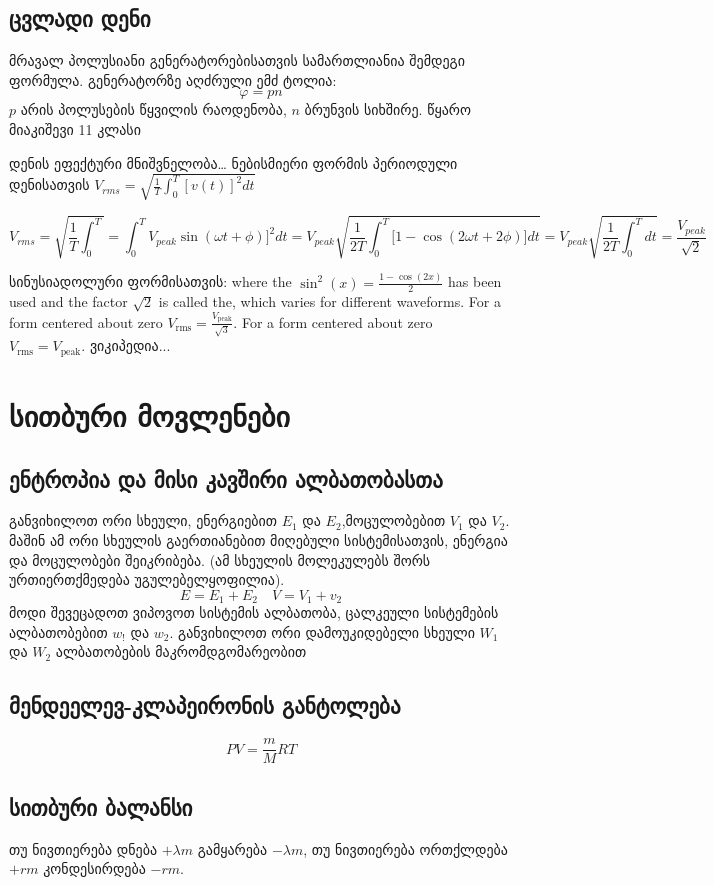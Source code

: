 \documentclass{book}
\begin{document}
\section{ცვლადი დენი}
მრავალ პოლუსიანი გენერატორებისათვის სამართლიანია შემდეგი ფორმულა. გენერატორზე აღძრული ემძ ტოლია:
$$\varphi = pn$$
$p$ არის პოლუსების წყვილის რაოდენობა, $n$ ბრუნვის სიხშირე. წყარო მიაკიშევი 11 კლასი

დენის ეფექტური მნიშვნელობა\dots
ნებისმიერი ფორმის პერიოდული დენისათვის
$V_{rms} = \sqrt{\frac{1}{T} \int_0^{T}{[v(t)]^2 dt}}$


$$V_{rms} = \sqrt{\frac{1}{T}\int_0^{T}}=\int_0^{T}V_{peak}\sin(\omega t + \phi)]^2 dt = V_{peak}\sqrt{\frac{1}{2T} \int_0^{T}[{1 - \cos(2\omega t + 2\phi)] dt}} = V_{peak}\sqrt{\frac{1}{2T} \int_0^{T}{dt}} =\frac{V_{peak}}{\sqrt {2}}$$

სინუსიადოლური ფორმისათვის:
where the $\sin^2(x) = \frac {1 - \cos(2x)}{2}$ has been used and the factor $\sqrt{2}$ is called the, which varies for different waveforms.
For a form centered about zero
$V_\text{rms} = \frac{V_\text{peak}}{\sqrt{3}}.$
For a form centered about zero
$V_\text{rms} = V_\text{peak}.$
ვიკიპედია...

\chapter{სითბური მოვლენები}
\section{ენტროპია და მისი კავშირი ალბათობასთა}
განვიხილოთ ორი სხეული, ენერგიებით $E_1$ და $E_2$,მოცულობებით $V_1$ და $V_2$. მაშინ ამ ორი სხეულის გაერთიანებით მიღებული სისტემისათვის, ენერგია და მოცულობები შეიკრიბება. (ამ სხეულის მოლეკულებს შორს ურთიერთქმედება უგულებელყოფილია).
$$E = E_1 + E_2 \quad V = V_1 + v_2$$
მოდი შევეცადოთ ვიპოვოთ სისტემის ალბათობა, ცალკეული სისტემების ალბათობებით $w_!$ და $w_2$. განვიხილოთ ორი დამოუკიდებელი სხეული $W_1$ და $W_2$ ალბათობების მაკრომდგომარეობით

\section{მენდეელევ-კლაპეირონის განტოლება}
$$PV = \frac{m}{M}RT$$

\section{სითბური ბალანსი}
თუ ნივთიერება დნება $+\lambda m$ გამყარება $-\lambda m$, თუ ნივთიერება ორთქლდება $+r m$ კონდესირდება $-rm$.
\end{document}
